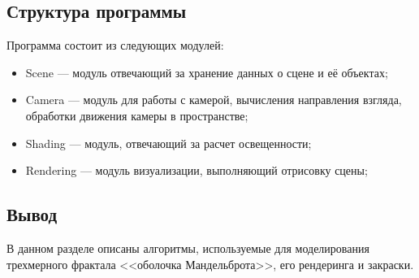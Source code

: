 \subsection{Структура программы}

Программа состоит из следующих модулей:

\begin{itemize}
  \item Scene --- модуль отвечающий за хранение данных о сцене и её объектах;
  \item Camera --- модуль для работы с камерой, вычисления направления взгляда,
    обработки движения камеры в пространстве;
  \item Shading --- модуль, отвечающий за расчет освещенности;
  \item Rendering --- модуль визуализации, выполняющий отрисовку сцены;
\end{itemize}

\subsection*{Вывод}

В данном разделе описаны алгоритмы, используемые для моделирования трехмерного фрактала
<<оболочка Мандельброта>>, его рендеринга и закраски.

\clearpage

